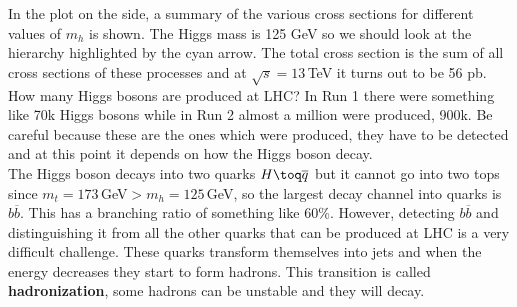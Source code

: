 \documentclass[../main.tex]{subfiles}
\begin{document}
In the plot on the side, a summary of the various cross sections for different values of $m_h$ is shown. The Higgs mass is 125 GeV so we should look at the hierarchy highlighted by the cyan arrow. The total cross section is the sum of all cross sections of these processes and at $\sqrt{s}=13$\,TeV it turns out to be 56 pb. How many Higgs bosons are produced at LHC? In Run 1 there were something like 70k Higgs bosons while in Run 2 almost a million were produced, 900k. Be careful because these are the ones which were produced, they have to be detected and at this point it depends on how the Higgs boson decay.\\
The Higgs boson decays into two quarks $H\toq\overline{q}$ but it cannot go into two tops since $m_t=173$\,GeV$>m_h=125$\,GeV, so the largest decay channel into quarks is $b\overline{b}$. This has a branching ratio of something like 60\%. However, detecting $b\overline{b}$ and distinguishing it from all the other quarks that can be produced at LHC is a very difficult challenge. These quarks transform themselves into jets and when the energy decreases they start to form hadrons. This transition is called \textbf{hadronization}, some hadrons can be unstable and they will decay.  
\end{document}
